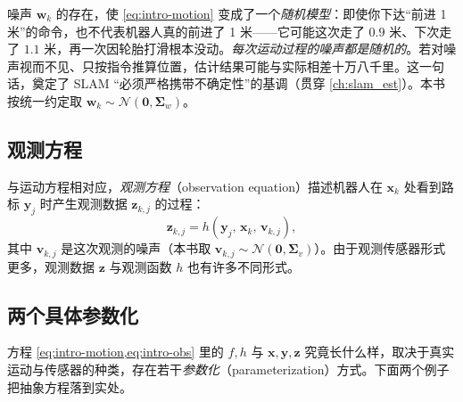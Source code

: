 \begin{insight}
噪声 $\mathbf{w}_k$ 的存在，使 \cref{eq:intro-motion} 变成了一个\emph{随机模型}\cite{gaoxiang2019slam14}：即使你下达“前进 1 米”的命令，也不代表机器人真的前进了 1 米——它可能这次走了 $0.9$ 米、下次走了 $1.1$ 米，再一次因轮胎打滑根本没动。\emph{每次运动过程的噪声都是随机的}。若对噪声视而不见、只按指令推算位置，估计结果可能与实际相差十万八千里。这一句话，奠定了 SLAM “必须严格携带不确定性”的基调（贯穿 \cref{ch:slam_est}）。本书按统一约定取 $\mathbf{w}_k\sim\mathcal{N}(\mathbf{0},\boldsymbol{\Sigma}_w)$。
\end{insight}

\subsection{观测方程}
\label{sec:intro-obs}
与运动方程相对应，\emph{观测方程}（observation equation）描述机器人在 $\mathbf{x}_k$ 处看到路标 $\mathbf{y}_j$ 时产生观测数据 $\mathbf{z}_{k,j}$ 的过程\cite{gaoxiang2019slam14}：
\begin{equation}
  \mathbf{z}_{k,j} = h\!\left(\mathbf{y}_j,\, \mathbf{x}_k,\, \mathbf{v}_{k,j}\right),
  \label{eq:intro-obs}
\end{equation}
其中 $\mathbf{v}_{k,j}$ 是这次观测的噪声（本书取 $\mathbf{v}_{k,j}\sim\mathcal{N}(\mathbf{0},\boldsymbol{\Sigma}_v)$）。由于观测传感器形式更多，观测数据 $\mathbf{z}$ 与观测函数 $h$ 也有许多不同形式。

\subsection{两个具体参数化}
\label{sec:intro-param}
方程 \cref{eq:intro-motion,eq:intro-obs} 里的 $f,h$ 与 $\mathbf{x},\mathbf{y},\mathbf{z}$ 究竟长什么样，取决于真实运动与传感器的种类，存在若干\emph{参数化}（parameterization）方式\cite{gaoxiang2019slam14}。下面两个例子把抽象方程落到实处。

